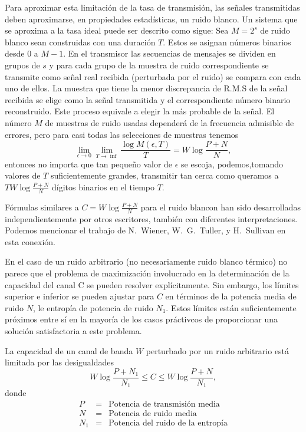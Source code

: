 Para aproximar esta limitaci\'on de la tasa de transmisi\'on, las
se\~nales transmitidas deben aproximarse, en propiedades
estad\'isticas, un ruido blanco. Un sistema que se aproxima a la tasa
ideal puede ser descrito como sigue: Sea $M = 2^s$ de ruido blanco
sean construidas con una duraci\'{o}n $T$. Estos se asignan n\'umeros
binarios desde 0 a $M-1$. En el transmisor las secuencias de mensajes
se dividen en grupos de $s$ y para cada grupo de la muestra de ruido
correspondiente se transmite como se\~nal real recibida (perturbada
por el ruido) se compara con cada uno de ellos.  La muestra que tiene
la menor discrepancia de R.M.S de la se\~nal recibida se elige como la
se\~nal transmitida y el correspondiente n\'umero binario
reconstruido.  Este proceso equivale a elegir la m\'as probable de la
se\~nal.  El n\'umero $M$ de muestras de ruido usadas depender\'a de
la frecuencia admisible de errores, pero para casi todas las
selecciones de muestras tenemos
\begin{equation}
\lim_{\epsilon \to 0} \lim_{T\to \inf}
\frac{\log M(\epsilon, T)}{T} = W\log \frac{P+N}{N},
\end{equation}
entonces no importa que tan peque\~no valor de $\epsilon$ se escoja,
podemos,tomando valores de $T$ suficientemente grandes, transmitir tan
cerca como queramos a $TW\log \frac{P+N}{N}$ d\'igitos binarios en el
tiempo $T$.
	
F\'ormulas similares a $C = W\log \frac{P+N}{N}$ para el ruido blancon
han sido desarrolladas independientemente por otros escritores,
tambi\'en con diferentes interpretaciones. Podemos mencionar el
trabajo de N.\ Wiener, W.\ G.\ Tuller, y H.\ Sullivan en esta
conexi\'on.

En el caso de un ruido arbitrario (no necesariamente ruido blanco
t\'ermico) no parece que el problema de maximizaci\'on involucrado en
la determinaci\'on de la capacidad del canal C se pueden resolver
expl\'icitamente. Sin embargo, los l\'imites superior e inferior se
pueden ajustar para $C$ en t\'erminos de la potencia media de ruido
$N$, le entrop\'ia de potencia de ruido $N_{1}$.  Estos l\'imites
est\'an suficientemente pr\'oximos entre s\'i en la mayor\'ia de los
casos pr\'activcos de proporcionar una soluci\'on satisfactoria a este
problema.

\begin{theorem}
\label{th:18}
La capacidad de un canal de banda $W$ perturbado por un ruido
arbitrario est\'a limitada por las desigualdades
\begin{equation}
W\log \frac{P+N_{1}}{N_{1}} \leq C \leq W\log \frac{P+N}{N_{1}},
\end{equation}
donde 
\begin{equation}
\begin{array}{rcl}
P &=& \text{Potencia de transmisi\'on media} \\
N &=& \text{Potencia de ruido media} \\
N_{1} &=& \text{Potencia del ruido de la entrop\'ia}
\end{array}
\end{equation}
\end{theorem}	

